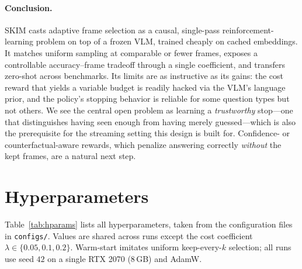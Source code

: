 \documentclass{article}
\begin{document}
\paragraph{Conclusion.}
SKIM casts adaptive frame selection as a causal, single-pass reinforcement-learning
problem on top of a frozen VLM, trained cheaply on cached embeddings. It matches
uniform sampling at comparable or fewer frames, exposes a controllable accuracy--frame
tradeoff through a single coefficient, and transfers zero-shot across benchmarks. Its
limits are as instructive as its gains: the cost reward that yields a variable budget
is readily hacked via the VLM's language prior, and the policy's stopping behavior is
reliable for some question types but not others. We see the central open problem as
learning a \emph{trustworthy} stop---one that distinguishes having seen enough from
having merely guessed---which is also the prerequisite for the streaming setting this
design is built for. Confidence- or counterfactual-aware rewards, which penalize
answering correctly \emph{without} the kept frames, are a natural next step.





\appendix
\section{Hyperparameters}
\label{app:hparams}
Table~\ref{tab:hparams} lists all hyperparameters, taken from the configuration files in
\texttt{configs/}. Values are shared across runs except the cost coefficient
$\lambda\in\{0.05,0.1,0.2\}$. Warm-start imitates uniform keep-every-$k$ selection; all
runs use seed $42$ on a single RTX 2070 (8\,GB) and AdamW.
\end{document}
